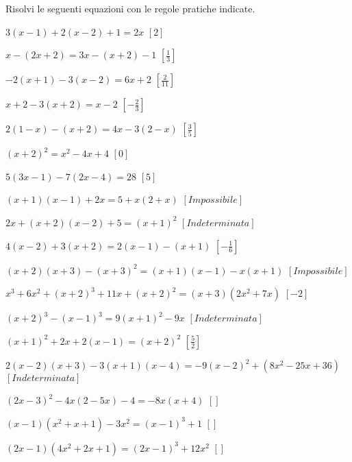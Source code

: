 \begin{esercizio}[\Ast]
\label{ese:13.14}
Risolvi le seguenti equazioni con le regole pratiche indicate.
 \begin{enumeratea}
 \item $3(x-1)+2(x-2)+1=2x$ \hfill $\left[2\right]$
 \item $x-(2x+2)=3x-(x+2)-1$ \hfill $\left[\frac{1}{3}\right]$
 \item $-2(x+1)-3(x-2)=6x+2$ \hfill $\left[\frac{2}{11}\right]$
 \item $x+2-3(x+2)=x-2$ \hfill $\left[-\frac{2}{3}\right]$
 \item $2(1-x)-(x+2)=4x-3(2-x)$ \hfill $\left[\frac{3}{5}\right]$
 \item $(x+2)^{2}=x^{2}-4x+4$ \hfill $\left[0\right]$
 \item $5(3x-1)-7(2x-4)=28$ \hfill $\left[5\right]$
 \item $(x+1)(x-1)+2x=5+x(2+x)$ \hfill $\left[Impossibile\right]$
 \item $2x+(x+2)(x-2)+5=(x+1)^{2}$ \hfill $\left[Indeterminata\right]$
 \item $4(x-2)+3(x+2)=2(x-1)-(x+1)$ \hfill $\left[-\frac{1}{6}\right]$
 \item $(x+2)(x+3)-(x+3)^{2}=(x+1)(x-1)-x(x+1)$ 
  \hfill $\left[Impossibile\right]$
 \item $x^{3}+6x^{2}+(x+2)^{3}+11x+(x+2)^{2}=(x+3)\left(2x^{2}+7x\right)$ 
  \hfill $\left[-2\right]$
 \item $(x+2)^{3}-(x-1)^{3}=9(x+1)^{2}-9x$ \hfill $\left[Indeterminata\right]$
 \item $(x+1)^{2}+2x+2(x-1)=(x+2)^{2}$ \hfill $\left[\frac{5}{2}\right]$
 \item $2(x-2)(x+3)-3(x+1)(x-4)=-9(x-2)^{2}+\left(8x^{2}-25x+36\right)$ 
  \hfill $\left[Indeterminata\right]$
 \item $(2x-3)^{2}-4x(2-5x)-4=-8x(x+4)$ \hfill $\left[\right]$
 \item $(x-1)\left(x^{2}+x+1\right)-3x^{2}=(x-1)^{3}+1$ \hfill $\left[\right]$
 \item $(2x-1)\left(4x^{2}+2x+1\right)=(2x-1)^{3}+12x^{2}$ 
  \hfill $\left[\right]$
 \end{enumeratea}
\end{esercizio}


